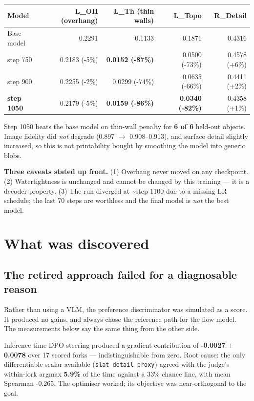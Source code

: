 \documentclass[11pt,a4paper]{article}
\newcommand{\good}[1]{\textcolor{good}{\textbf{#1}}}
\begin{document}
\begin{center}\small
\begin{tabular}{@{}lrrrr@{}}
\toprule
\textbf{Model} & \textbf{L\_OH (overhang)} & \textbf{L\_Th (thin walls)} & \textbf{L\_Topo} & \textbf{R\_Detail} \\
\midrule
Base model & 0.2291 & 0.1133 & 0.1871 & 0.4316 \\
step 750 & 0.2183 (-5\%) & \good{0.0152 (-87\%)} & 0.0500 (-73\%) & 0.4578 (+6\%) \\
step 900 & 0.2255 (-2\%) & 0.0299 (-74\%) & 0.0635 (-66\%) & 0.4411 (+2\%) \\
\textbf{step 1050} & 0.2179 (-5\%) & \good{0.0159 (-86\%)} & \good{0.0340 (-82\%)} & 0.4358 (+1\%) \\
\bottomrule
\end{tabular}
\end{center}
Step 1050 beats the base model on thin-wall penalty for \textbf{6 of 6} held-out objects. Image
fidelity did \textit{not} degrade (0.897 $\rightarrow$ 0.908--0.913), and surface detail slightly increased,
so this is not printability bought by smoothing the model into generic blobs.

\begin{center}\colorbox{boxbg}{\parbox{0.95\linewidth}{\vspace{3pt}\textbf{Three caveats stated up front.}
(1) Overhang never moved on any checkpoint.
(2) Watertightness is unchanged and cannot be changed by this training --- it is a decoder property.
(3) The run diverged at \textasciitilde{}step 1100 due to a missing LR schedule; the last 70 steps are worthless and
the final model is \textit{not} the best model.\vspace{3pt}}}\end{center}
\section{What was discovered}
\subsection{The retired approach failed for a diagnosable reason}
Rather than using a VLM, the preference discriminator was simulated as a score. It produced no
gains, and always chose the reference path for the flow model. The measurements below say the same
thing from the other side.

Inference-time DPO steering produced a gradient contribution of \textbf{-0.0027 $\pm$ 0.0078} over
17 scored forks --- indistinguishable from zero. Root cause: the only differentiable scalar available
(\texttt{slat\_detail\_proxy}) agreed with the judge's within-fork argmax \textbf{5.9\%} of the time against
a 33\% chance line, with mean Spearman -0.265. The optimiser worked; its objective was
near-orthogonal to the goal.
\end{document}
